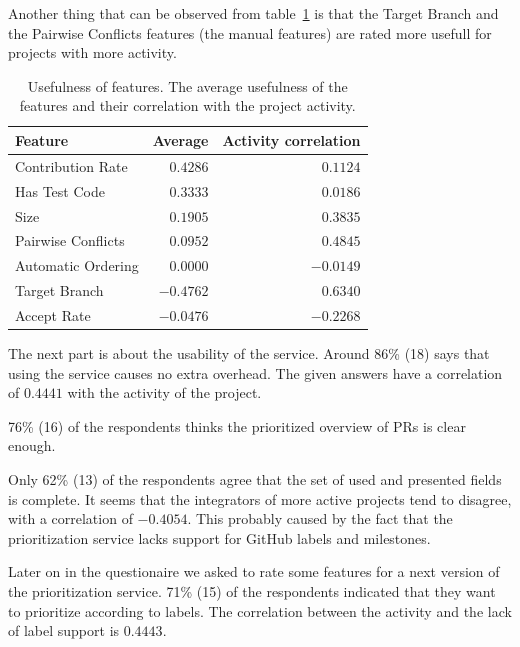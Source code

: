 Another thing that can be observed from table~\ref{tab:usefulness} is that the Target Branch and the Pairwise Conflicts features (the manual features) are rated more usefull for projects with more activity.

\begin{table}
  \centering
  \begin{tabular}{lrr}
    \hline
    \textbf{Feature} & \textbf{Average} & \textbf{Activity correlation} \\
    \hline
    Contribution Rate  &  $0.4286$ &  $0.1124$ \\
    Has Test Code      &  $0.3333$ &  $0.0186$ \\
    Size               &  $0.1905$ &  $0.3835$ \\
    Pairwise Conflicts &  $0.0952$ &  $0.4845$ \\
    Automatic Ordering &  $0.0000$ & $-0.0149$ \\
    Target Branch      & $-0.4762$ &  $0.6340$ \\
    Accept Rate        & $-0.0476$ & $-0.2268$ \\
    \hline
  \end{tabular}
  \caption[Usefulness of features]{Usefulness of features. The average usefulness of the features and their correlation with the project activity.}
  \label{tab:usefulness}
\end{table}

The next part is about the usability of the service.
Around 86\% (18) says that using the service causes no extra overhead.
The given answers have a correlation of $0.4441$ with the activity of the project.

76\% (16) of the respondents thinks the prioritized overview of PRs is clear enough.

Only 62\% (13) of the respondents agree that the set of used and presented fields is complete.
It seems that the integrators of more active projects tend to disagree, with a correlation of $-0.4054$.
This probably caused by the fact that the prioritization service lacks support for GitHub labels and milestones.

Later on in the questionaire we asked to rate some features for a next version of the prioritization service.
71\% (15) of the respondents indicated that they want to prioritize according to labels.
The correlation between the activity and the lack of label support is $0.4443$.

